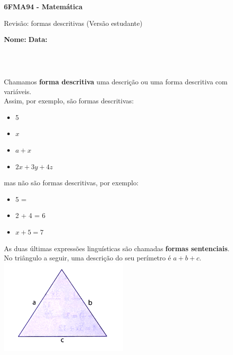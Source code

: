 \documentclass[a4paper,14pt]{article}
\begin{document}
	
	\noindent\textbf{6FMA94 - Matemática} 
	
	\begin{center}Revisão: formas descritivas (Versão estudante)
	\end{center}
	
	\noindent\textbf{Nome:} \underline{\hspace{10cm}}
	\noindent\textbf{Data:} \underline{\hspace{4cm}}
	
	~ \\ ~
	\begin{multicols}{2}
	\noindent Chamamos \textbf{forma descritiva} uma descrição ou uma forma descritiva com variáveis. \\
	Assim, por exemplo, são formas descritivas:
	\begin{itemize}
		\item 5
		\item $x$
		\item $a + x$
		\item $2x + 3y + 4z$
	\end{itemize}
	mas não são formas descritivas, por exemplo:
	\begin{itemize}
		\item 5 =
		\item 2 + 4 = 6
		\item $x + 5 = 7$
	\end{itemize}
	As duas últimas expressões linguísticas são chamadas \textbf{formas sentenciais}. \\
	No triângulo a seguir, uma descrição do seu perímetro é $a + b + c$.
	\includegraphics[width=1\linewidth]{imagens_6FMA94/imagem1}
	\end{multicols}
\end{document}
